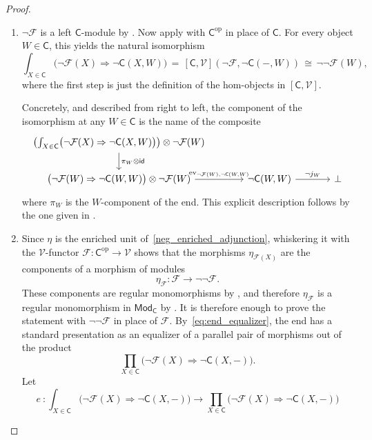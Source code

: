 \documentclass[11pt,onecolumn]{article}
\newcommand{\id}{\mathsf{id}}
\newcommand{\ev}{\mathrm{ev}}
\newcommand{\cV}{\mathscr{V}}
\newcommand{\cC}{\mathsf{C}}
\newcommand{\op}{\mathrm{op}}
\newcommand{\Mod}{\mathsf{Mod}}
\theoremstyle{plain}
\theoremstyle{remark}
\theoremstyle{definition}
\begin{document}
\begin{proof}
	\begin{enumerate}
		\item
			$\neg \mathcal{F}$ is a left $\cC$-module by .
			Now apply  with $\cC^\op$ in place of $\cC$.
			For every object $W \in \cC$, this yields the natural isomorphism
			\[
				\int_{X \in \cC} \bigl(\neg \mathcal{F}(X) \Rightarrow \neg \cC(X,W)\bigr)
				\,=\,
				[\cC,\cV](\neg \mathcal{F}, \neg \cC(-,W))
				\,\cong\,
				\neg\neg \mathcal{F}(W),
			\]
			where the first step is just the definition of the hom-objects in $[\cC,\cV]$.

			Concretely, and described from right to left, the component of the isomorphism at any $W \in \cC$ is the name of the composite
			\[
				\begin{tikzcd}[column sep=large]
					\left(\int_{X \in \cC} \bigl(\neg \mathcal{F}(X) \Rightarrow \neg \cC(X,W)\bigr)\right)\otimes\neg\mathcal{F}(W)
					\ar[d, "\pi_W\otimes\id"]
					\\
					\bigl(\neg\mathcal{F}(W)\Rightarrow\neg\cC(W,W)\bigr)\otimes\neg\mathcal{F}(W)
					\ar[r, "\ev_{\neg\mathcal{F}(W),\neg\cC(W,W)}"]
						&
						\neg\cC(W,W)
						\ar[r, "\neg j_W"]
						&
						\bot
				\end{tikzcd}
			\]
			where $\pi_W$ is the $W$-component of the end.
			This explicit description follows by the one given in .
		\item
			Since $\eta$ is the enriched unit of~\eqref{neg_enriched_adjunction}, whiskering it with the $\cV$-functor $\mathcal{F}\colon\cC^\op\to\cV$ shows that the morphisms $\eta_{\mathcal{F}(X)}$ are the components of a morphism of modules
			\[
				\eta_{\mathcal{F}}\colon\mathcal{F}\longrightarrow\neg\neg\mathcal{F}.
			\]
			These components are regular monomorphisms by , and therefore $\eta_{\mathcal{F}}$ is a regular monomorphism in $\Mod_\cC$ by .
			It is therefore enough to prove the statement with $\neg\neg \mathcal{F}$ in place of $\mathcal{F}$.
			By~\eqref{eq:end_equalizer}, the end has a standard presentation as an equalizer of a parallel pair of morphisms out of the product
			\[
				\prod_{X \in \cC} \bigl(\neg \mathcal{F}(X) \Rightarrow \neg \cC(X,-)\bigr).
			\]
			Let
			\[
				e \: \colon \int_{X \in \cC} \bigl(\neg \mathcal{F}(X) \Rightarrow \neg \cC(X,-)\bigr)
				\longrightarrow
				\prod_{X \in \cC} \bigl(\neg \mathcal{F}(X) \Rightarrow \neg \cC(X,-)\bigr)
\]
\end{enumerate}
\end{proof}
\end{document}
